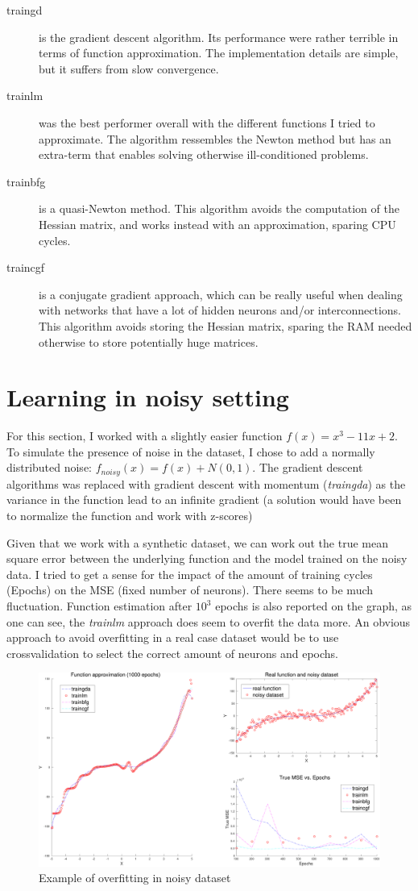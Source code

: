 \documentclass[11pt, a4paper]{article}
\begin{document}
\begin{description}
\item [traingd] is the gradient descent algorithm. Its performance
  were rather terrible in terms of function approximation. The
  implementation details are simple, but it suffers from slow
  convergence.
\item [trainlm] was the best performer overall with the different
  functions I tried to approximate. The algorithm ressembles the
  Newton method but has an extra-term that enables solving otherwise
  ill-conditioned problems.
\item [trainbfg] is a quasi-Newton method. This algorithm avoids the
  computation of the Hessian matrix, and works instead with an
  approximation, sparing CPU cycles.
\item [traincgf] is a conjugate gradient approach, which can be really
  useful when dealing with networks that have a lot of hidden neurons
  and/or interconnections. This algorithm avoids storing the Hessian
  matrix, sparing the RAM needed otherwise to store potentially huge
  matrices.
\end{description}

\section{Learning in noisy setting}

For this section, I worked with a slightly easier function
$f(x)=x^3-11x+2$. To simulate the presence of noise in the dataset, I
chose to add a normally distributed noise:
$f_{noisy}(x)=f(x)+N(0,1)$. The gradient descent algorithms was
replaced with gradient descent with momentum (\emph{traingda}) as the
variance in the function lead to an infinite gradient (a solution
would have been to normalize the function and work with z-scores)

Given that we work with a synthetic dataset, we can work out the true
mean square error between the underlying function and the model
trained on the noisy data. I tried to get a sense for the impact of
the amount of training cycles (Epochs) on the MSE (fixed number of
neurons). There seems to be much fluctuation. Function estimation
after $10^3$ epochs is also reported on the graph, as one can see, the
\emph{trainlm} approach does seem to overfit the data more. An obvious
approach to avoid overfitting in a real case dataset would be to use
crossvalidation to select the correct amount of neurons and epochs.

\begin{figure}[H]
  \includegraphics[scale=.40]{ffnn_noisy_testmse.pdf}
  \caption{Example of overfitting in noisy dataset}  
  \label{fig:trainnoise}
\end{figure}

{\footnotesize
 
}
\end{document}
